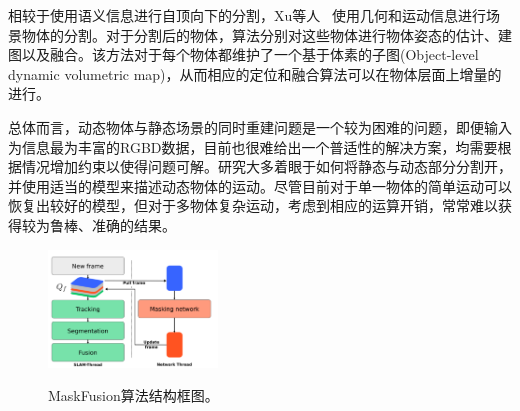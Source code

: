相较于使用语义信息进行自顶向下的分割，Xu等人 ~\cite{2019MIDFusion}使用几何和运动信息进行场景物体的分割。对于分割后的物体，算法分别对这些物体进行物体姿态的估计、建图以及融合。该方法对于每个物体都维护了一个基于体素的子图(Object-level dynamic volumetric map)，从而相应的定位和融合算法可以在物体层面上增量的进行。

总体而言，动态物体与静态场景的同时重建问题是一个较为困难的问题，即便输入为信息最为丰富的RGBD数据，目前也很难给出一个普适性的解决方案，均需要根据情况增加约束以使得问题可解。研究大多着眼于如何将静态与动态部分分割开，并使用适当的模型来描述动态物体的运动。尽管目前对于单一物体的简单运动可以恢复出较好的模型，但对于多物体复杂运动，考虑到相应的运算开销，常常难以获得较为鲁棒、准确的结果。


\begin{figure}[htbp]
	\centering
	\includegraphics[width=0.4\textwidth]{figs/2-2/maskfusion.png} 
	\label{fig:MaskFusion-framework}
	\caption{MaskFusion算法结构框图。}
\end{figure}
